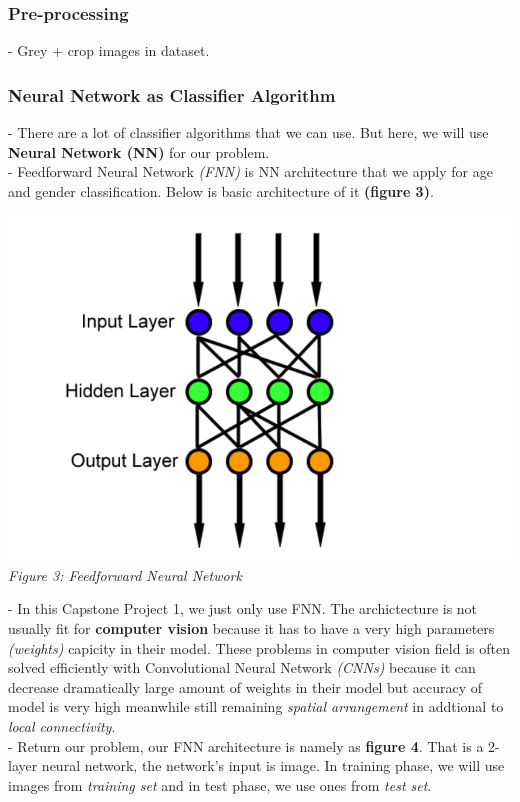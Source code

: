 \subsubsection{Pre-processing}
- Grey + crop images in dataset.
\subsubsection{Neural Network as Classifier Algorithm}
- There are a lot of classifier algorithms that we can use. But here, we will use \textbf{Neural Network (NN)} for our problem.\\
- Feedforward Neural Network \textit{(FNN)} is NN architecture that we apply for age and gender classification. Below is basic architecture of it \textbf{(figure 3)}.\\
\begin{center}
\includegraphics[scale=0.30]{feedforward_architecture} \\
\textit{Figure 3: Feedforward Neural Network}
\end{center}
- In this Capstone Project 1, we just only use FNN. The archictecture is not usually fit for \textbf{computer vision} because it has to have a very high parameters \textit{(weights)} capicity in their model. These problems in computer vision field is often solved efficiently with Convolutional Neural Network \textit{(CNNs)} because it can decrease dramatically large amount of weights in their model but accuracy of model is very high meanwhile still remaining \textit{spatial arrangement} in addtional to \textit{local connectivity}.\\
- Return our problem, our FNN architecture is namely as \textbf{figure 4}. That is a 2-layer neural network, the network's input is image. In training phase, we will use images from \textit{training set} and in test phase, we use ones from \textit{test set}.
